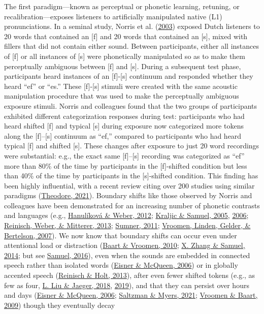 \documentclass[
  11pt,
  english,
  man,floatsintext]{apa6}
\begin{document}
The first paradigm---known as perceptual or phonetic learning, retuning, or recalibration---exposes listeners to artificially manipulated native (L1) pronunciations. In a seminal study, Norris et al. (\protect\hyperlink{ref-norris2003}{2003}) exposed Dutch listeners to 20 words that contained an {[}f{]} and 20 words that contained an {[}s{]}, mixed with fillers that did not contain either sound. Between participants, either all instances of {[}f{]} or all instances of {[}s{]} were phonetically manipulated so as to make them perceptually ambiguous between {[}f{]} and {[}s{]}. During a subsequent test phase, participants heard instances of an {[}f{]}-{[}s{]} continuum and responded whether they heard ``ef'' or ``es.'' These {[}f{]}-{[}s{]} stimuli were created with the same acoustic manipulation procedure that was used to make the perceptually ambiguous exposure stimuli. Norris and colleagues found that the two groups of participants exhibited different categorization responses during test: participants who had heard shifted {[}f{]} and typical {[}s{]} during exposure now categorized more tokens along the {[}f{]}--{[}s{]} continuum as ``ef,'' compared to participants who had heard typical {[}f{]} and shifted {[}s{]}. These changes after exposure to just 20 word recordings were substantial: e.g., the exact same {[}f{]}--{[}s{]} recording was categorized as ``ef'' more than 80\% of the time by participants in the {[}f{]}-shifted condition but less than 40\% of the time by participants in the {[}s{]}-shifted condition. This finding has been highly influential, with a recent review citing over 200 studies using similar paradigms (\protect\hyperlink{ref-theodore2021}{Theodore, 2021}). Boundary shifts like those observed by Norris and colleagues have been demonstrated for an increasing number of phonetic contrasts and languages (e.g., \protect\hyperlink{ref-hanulikova-weber2012}{Hanulíková \& Weber, 2012}; \protect\hyperlink{ref-kraljic-samuel2005}{Kraljic \& Samuel, 2005}, \protect\hyperlink{ref-kraljic-samuel2006}{2006}; \protect\hyperlink{ref-reinisch2013}{Reinisch, Weber, \& Mitterer, 2013}; \protect\hyperlink{ref-sumner2011}{Sumner, 2011}; \protect\hyperlink{ref-vroomen2007}{Vroomen, Linden, Gelder, \& Bertelson, 2007}). We now know that boundary shifts can occur even under attentional load or distraction (\protect\hyperlink{ref-baart-vroomen2010}{Baart \& Vroomen, 2010}; \protect\hyperlink{ref-zhang-samuel2014}{X. Zhang \& Samuel, 2014}; but see \protect\hyperlink{ref-samuel2016}{Samuel, 2016}), even when the sounds are embedded in connected speech rather than isolated words (\protect\hyperlink{ref-eisner-mcqueen2006}{Eisner \& McQueen, 2006}) or in globally accented speech (\protect\hyperlink{ref-reinisch-holt2013}{Reinisch \& Holt, 2013}), after even fewer shifted tokens (e.g., as few as four, \protect\hyperlink{ref-liu-jaeger2018}{L. Liu \& Jaeger, 2018}, \protect\hyperlink{ref-liu-jaeger2019}{2019}), and that they can persist over hours and days (\protect\hyperlink{ref-eisner-mcqueen2006}{Eisner \& McQueen, 2006}; \protect\hyperlink{ref-saltzman-myers2021}{Saltzman \& Myers, 2021}; \protect\hyperlink{ref-vroomen-baart2009}{Vroomen \& Baart, 2009}) though they eventually decay 
\end{document}
